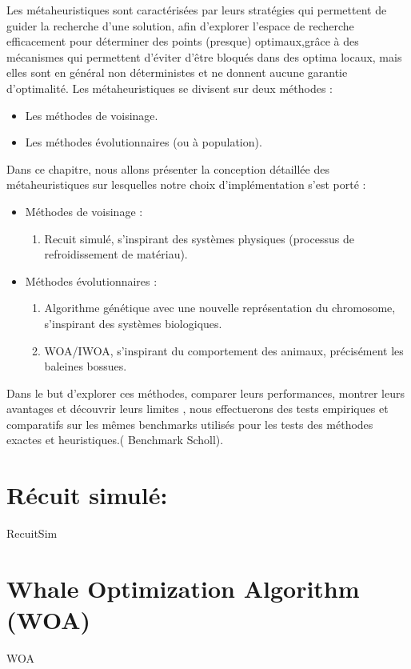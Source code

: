 \documentclass[12pt,a4paper, titlepage]{report}
\begin{document}
    Les métaheuristiques sont caractérisées par leurs stratégies qui permettent de guider la recherche d’une solution, afin d’explorer l’espace de recherche efficacement pour déterminer des points (presque) optimaux,grâce à des mécanismes qui permettent d’éviter d'être bloqués dans des optima locaux, mais elles sont en général non déterministes et ne donnent aucune garantie d’optimalité.
    Les métaheuristiques se divisent sur deux méthodes :
    \begin{itemize}
        \item Les méthodes de voisinage.
        \item Les méthodes évolutionnaires (ou à population).
    \end{itemize}
    Dans ce chapitre, nous allons présenter la conception détaillée des métaheuristiques sur lesquelles notre choix d’implémentation s’est porté :
    \begin{itemize}
        \item Méthodes de voisinage :
            \begin{enumerate}
                \item Recuit simulé, s’inspirant des systèmes physiques (processus de refroidissement de matériau).
            \end{enumerate}
        \item Méthodes évolutionnaires :
            \begin{enumerate}
                \item Algorithme génétique avec une nouvelle représentation du chromosome, s’inspirant des systèmes biologiques.
                \item WOA/IWOA, s’inspirant du comportement des animaux, précisément les baleines bossues.
            \end{enumerate}
    \end{itemize}
    Dans le but d’explorer ces méthodes, comparer leurs performances, montrer leurs avantages et découvrir leurs limites , nous effectuerons des tests empiriques et comparatifs sur les mêmes  benchmarks utilisés pour les tests des méthodes exactes et heuristiques.( Benchmark Scholl).
    \chapter{Récuit simulé: }
    {RecuitSim}
    \chapter{Whale Optimization Algorithm (WOA)}
    {WOA}
\end{document}
